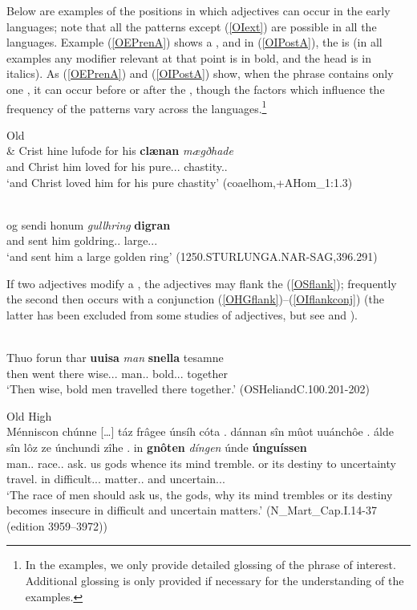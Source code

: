 \documentclass[output=paper,colorlinks,citecolor=brown,draft]{langscibook}
\begin{document}
 Below are examples of the positions in which adjectives can occur in the early  languages; note that all the patterns except (\ref{OIext}) are possible in all the languages. Example (\ref{OEPrenA}) shows a  , and in (\ref{OIPostA}), the  is  (in all examples any modifier relevant at that point is in bold, and the  head is in italics). As (\ref{OEPrenA}) and (\ref{OIPostA}) show, when the  phrase contains only one , it can occur before or after the , though the factors which influence the frequency of the patterns vary across the languages.\footnote{In the examples, we only provide detailed glossing of the  phrase of interest. Additional glossing is only provided if necessary for the understanding of the examples.}

\ea\label{OEPrenA}
Old \\
\gll \& Crist hine lufode for his \textbf{clænan} \textit{mægðhade}\\
and Christ him loved for his pure.\DAT.\SG.\WK{} chastity.\DAT.\SG\\
\glt`and Christ loved him for his pure chastity' (coaelhom,+AHom\_1:1.3)
\z

\ea\label{OIPostA}
\\
\gll og sendi honum \textit{gullhring} \textbf{digran}\\
	and sent him goldring.\ACC.\SG{} large.\ACC.\SG.\STR\\
\glt `and sent him a large golden ring' (1250.STURLUNGA.NAR-SAG,396.291)
\z

If two adjectives modify a , the adjectives may flank the  (\ref{OSflank}); frequently the second  then occurs with a conjunction (\ref{OHGflank})–(\ref{OIflankconj}) (the latter has been excluded from some studies of  adjectives, but see \citealt{Haumann03} and \citealt{Grabski17}).

\ea\label{OSflank}
\\
\gll Thuo forun thar \textbf{uuisa} \textit{man} \textbf{snella} tesamne\\
then went there wise.\NOM.\PL.\STR{} man.\NOM.\PL{} bold.\NOM.\PL.\STR{} together\\
\glt `Then wise, bold men travelled there together.' (OSHeliandC.100.201-202)
\z

\ea\label{OHGflank}
Old High \\
\gll Ménniscon chúnne […] táz frâgee únsíh cóta . dánnan sîn mûot uuánchôe . álde sîn lôz ze únchundi zîhe . in \textbf{gnôten} \textit{díngen} únde \textbf{únguíssen}\\
man.\GEN.\PL{} race.\NOM.\SG{} {} \DEM{}  ask.\SBJV{} us gods {} whence its mind tremble.\SBJV{} {} or its destiny to uncertainty travel.\SBJV{} {} in difficult.\DAT.\PL.\STR{} matter.\DAT.\PL{} and uncertain.\DAT.\PL.\STR{}\\
\glt`The race of men should ask us, the gods, why its mind trembles or its destiny becomes insecure in difficult and uncertain matters.' (N\_Mart\_Cap.I.14-37 (edition 3959–3972))
\z
\end{document}
